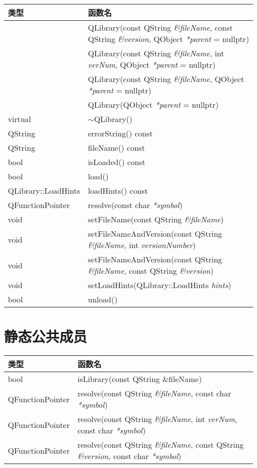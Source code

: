 \begin{longtable}{|l|m{25em}|}
\hline
 类型& 	函数名\\
\hline
	&QLibrary(const QString \emph{\&fileName}, const QString \emph{\&version},
   QObject \emph{*parent} = nullptr)\\
\hline
	&QLibrary(const QString \emph{\&fileName}, int \emph{verNum}, QObject \emph{*parent} =
   nullptr)\\
\hline
	&QLibrary(const QString \emph{\&fileName}, QObject \emph{*parent} = nullptr)\\
\hline
	&QLibrary(QObject \emph{*parent} = nullptr)\\
\hline
virtual& 	$\sim$QLibrary()\\
\hline
QString& 	errorString() const\\
\hline
QString& 	fileName() const\\
\hline
bool& 	isLoaded() const\\
\hline
bool& 	load()\\
\hline
QLibrary::LoadHints& 	loadHints() const\\
\hline
QFunctionPointer& 	resolve(const char \emph{*symbol})\\
\hline
void& 	setFileName(const QString \emph{\&fileName})\\
\hline
void& 	setFileNameAndVersion(const QString \emph{\&fileName}, int \emph{versionNumber})\\
\hline
void& 	setFileNameAndVersion(const QString \emph{\&fileName}, const QString
      \emph{\&version})\\
\hline
void& 	setLoadHints(QLibrary::LoadHints \emph{hints})\\
\hline
bool& 	unload()\\
\hline
\end{longtable}

\section{静态公共成员}

\begin{tabular}{|l|l|}
\hline
类型& 	函数名\\
\hline
bool& 	isLibrary(const QString \&fileName)\\
\hline
QFunctionPointer& 	resolve(const QString \emph{\&fileName}, const char
                  \emph{*symbol})\\
\hline
QFunctionPointer& 	resolve(const QString \emph{\&fileName}, int \emph{verNum}, const char \emph{*symbol})\\
\hline
QFunctionPointer& 	resolve(const QString \emph{\&fileName}, const QString \emph{\&version}, const char \emph{*symbol})\\
\hline
\end{tabular}

